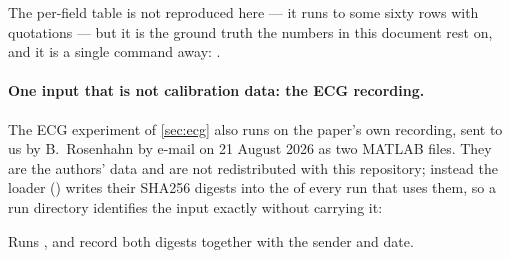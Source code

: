 The per-field table is not reproduced here --- it runs to some sixty rows with quotations ---
but it is the ground truth the numbers in this document rest on, and it is a single command
away: .

\paragraph{One input that is not calibration data: the ECG recording.}
The ECG experiment of \cref{sec:ecg} also runs on the paper's own recording, sent to us by
B.~Rosenhahn by e-mail on 21 August 2026 as two MATLAB files.  They are the authors' data and are
not redistributed with this repository; instead the loader () writes their
SHA256 digests into the  of every run that uses them, so a run directory
identifies the input exactly without carrying it:

\begin{description}[leftmargin=1.2em,style=nextline,itemsep=2pt]
\item[\code{ecgfilteredData.mat} --- the clean trace.]
\item[\code{ecgnoiseData.mat} --- the noisy trace, already clipped to {$[0,1]$}.]
\end{description}

\noindent Runs ,  and
 record both digests together with the sender and date.
